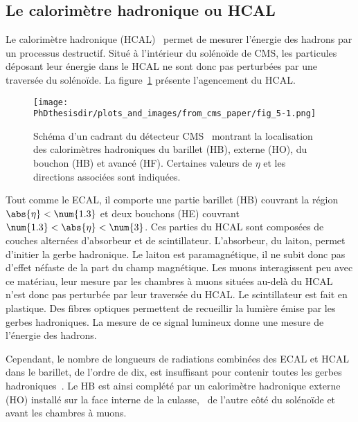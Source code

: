 \subsection{Le calorimètre hadronique ou HCAL}\label{chapter-LHC-section-CMS-subsec-HCAL}
Le calorimètre hadronique (HCAL)~\cite{cms_paper,CERN-LHCC-97-031} permet de mesurer l'énergie des hadrons par un processus destructif.
Situé à l'intérieur du solénoïde de CMS, les particules déposant leur énergie dans le HCAL ne sont donc pas perturbées par une traversée du solénoïde.
La figure~\ref{fig-chapter-LHC-section-CMS-subsec-HCAL-cms_paper-fig_5-1} présente l'agencement du HCAL.
\begin{figure}[h]
\centering
\texttt{[image: \\PhDthesisdir/plots\_and\_images/from\_cms\_paper/fig\_5-1.png]}
\caption[Schéma du calorimètre hadronique de CMS.]{Schéma d'un cadrant du détecteur CMS~\cite{cms_paper} montrant la localisation des calorimètres hadroniques du barillet (HB), externe (HO), du bouchon (HB) et avancé (HF). Certaines valeurs de $\eta$ et les directions associées sont indiquées.}
\label{fig-chapter-LHC-section-CMS-subsec-HCAL-cms_paper-fig_5-1}
\end{figure}
\par Tout comme le ECAL, il comporte une partie barillet (HB) couvrant la région $\abs{\eta}<\num{1.3}$ et deux bouchons (HE) couvrant $\num{1.3}<\abs{\eta}<\num{3}$.
Ces parties du HCAL sont composées de couches alternées d'absorbeur et de scintillateur.
L'absorbeur, du laiton, permet d'initier la gerbe hadronique.
Le laiton est paramagnétique, il ne subit donc pas d'effet néfaste de la part du champ magnétique.
Les muons interagissent peu avec ce matériau, leur mesure par les chambres à muons situées au-delà du HCAL n'est donc pas perturbée par leur traversée du HCAL.
Le scintillateur est fait en plastique.
Des fibres optiques permettent de recueillir la lumière émise par les gerbes hadroniques.
La mesure de ce signal lumineux donne une mesure de l'énergie des hadrons.
\par Cependant, le nombre de longueurs de radiations combinées des ECAL et HCAL dans le barillet, de l'ordre de dix, est insuffisant pour contenir toutes les gerbes hadroniques~\cite{cms_paper}.
Le HB est ainsi complété par un calorimètre hadronique externe (HO) installé sur la face interne de la culasse, \ie\ de l'autre côté du solénoïde et avant les chambres à muons.
